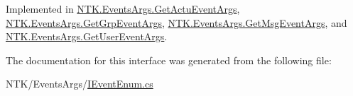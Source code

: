 Implemented in \mbox{\hyperlink{class_n_t_k_1_1_events_args_1_1_get_actu_event_args_adaa88e12981361422af1ca48219ffeab}{N\+T\+K.\+Events\+Args.\+Get\+Actu\+Event\+Args}}, \mbox{\hyperlink{class_n_t_k_1_1_events_args_1_1_get_grp_event_args_aa65b34fcf234ffa122c715bf3740e3ed}{N\+T\+K.\+Events\+Args.\+Get\+Grp\+Event\+Args}}, \mbox{\hyperlink{class_n_t_k_1_1_events_args_1_1_get_msg_event_args_ac22d3fa7eb7350703d07127f9a5d5ca0}{N\+T\+K.\+Events\+Args.\+Get\+Msg\+Event\+Args}}, and \mbox{\hyperlink{class_n_t_k_1_1_events_args_1_1_get_user_event_args_aa281ec855499c199f6f1978e038a6134}{N\+T\+K.\+Events\+Args.\+Get\+User\+Event\+Args}}.



The documentation for this interface was generated from the following file\+:\begin{DoxyCompactItemize}
\item 
N\+T\+K/\+Events\+Args/\mbox{\hyperlink{_i_event_enum_8cs}{I\+Event\+Enum.\+cs}}\end{DoxyCompactItemize}
